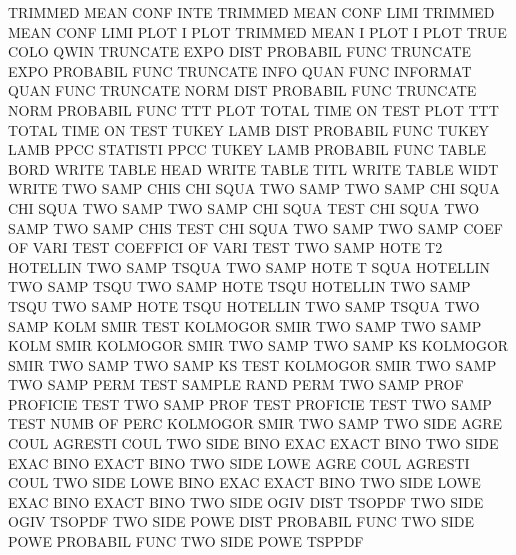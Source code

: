 TRIMMED  MEAN CONF INTE                 TRIMMED  MEAN CONF LIMI
TRIMMED  MEAN CONF LIMI PLOT            I        PLOT
TRIMMED  MEAN I    PLOT                 I        PLOT
TRUE     COLO                           QWIN
TRUNCATE EXPO DIST                      PROBABIL FUNC
TRUNCATE EXPO                           PROBABIL FUNC
TRUNCATE INFO QUAN FUNC                 INFORMAT QUAN FUNC
TRUNCATE NORM DIST                      PROBABIL FUNC
TRUNCATE NORM                           PROBABIL FUNC
TTT      PLOT                           TOTAL    TIME ON   TEST PLOT
TTT                                     TOTAL    TIME ON   TEST
TUKEY    LAMB DIST                      PROBABIL FUNC
TUKEY    LAMB PPCC                      STATISTI PPCC
TUKEY    LAMB                           PROBABIL FUNC
TABLE    BORD                           WRITE
TABLE    HEAD                           WRITE
TABLE    TITL                           WRITE
TABLE    WIDT                           WRITE
TWO      SAMP CHIS                      CHI      SQUA TWO  SAMP
TWO      SAMP CHI  SQUA                 CHI      SQUA TWO  SAMP
TWO      SAMP CHI  SQUA TEST            CHI      SQUA TWO  SAMP
TWO      SAMP CHIS TEST                 CHI      SQUA TWO  SAMP
TWO      SAMP COEF OF   VARI TEST       COEFFICI OF   VARI TEST
TWO      SAMP HOTE T2                   HOTELLIN TWO  SAMP TSQUA
TWO      SAMP HOTE T    SQUA            HOTELLIN TWO  SAMP TSQU
TWO      SAMP HOTE TSQU                 HOTELLIN TWO  SAMP TSQU
TWO      SAMP HOTE TSQU                 HOTELLIN TWO  SAMP TSQUA
TWO      SAMP KOLM SMIR TEST            KOLMOGOR SMIR TWO  SAMP
TWO      SAMP KOLM SMIR                 KOLMOGOR SMIR TWO  SAMP
TWO      SAMP KS                        KOLMOGOR SMIR TWO  SAMP
TWO      SAMP KS   TEST                 KOLMOGOR SMIR TWO  SAMP
TWO      SAMP PERM TEST                 SAMPLE   RAND PERM
TWO      SAMP PROF                      PROFICIE TEST
TWO      SAMP PROF TEST                 PROFICIE TEST
TWO      SAMP TEST NUMB OF   PERC       KOLMOGOR SMIR TWO  SAMP
TWO      SIDE AGRE COUL                 AGRESTI  COUL
TWO      SIDE BINO EXAC                 EXACT    BINO
TWO      SIDE EXAC BINO                 EXACT    BINO
TWO      SIDE LOWE AGRE COUL            AGRESTI  COUL
TWO      SIDE LOWE BINO EXAC            EXACT    BINO
TWO      SIDE LOWE EXAC BINO            EXACT    BINO
TWO      SIDE OGIV DIST                 TSOPDF
TWO      SIDE OGIV                      TSOPDF
TWO      SIDE POWE DIST                 PROBABIL FUNC
TWO      SIDE POWE                      PROBABIL FUNC
TWO      SIDE POWE                      TSPPDF
